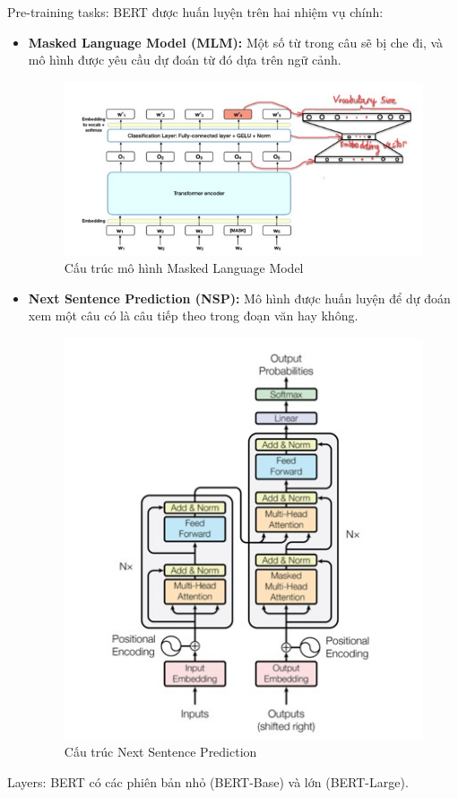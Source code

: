 Pre-training tasks: BERT được huấn luyện trên hai nhiệm vụ chính:
\begin{itemize}
    \item \textbf{Masked Language Model (MLM):} Một số từ trong câu sẽ bị che đi, và mô hình được yêu cầu dự đoán từ đó dựa trên ngữ cảnh.
    \begin{figure}[H] %
        \centering
        \includegraphics[width=0.6\linewidth]{Figures/bert2.jpg}
        \caption{Cấu trúc mô hình Masked Language Model}
        \label{fig:iot}
    \end{figure}

    \item \textbf{Next Sentence Prediction (NSP): } Mô hình được huấn luyện để dự đoán xem một câu có là câu tiếp theo trong đoạn văn hay không.
    \begin{figure}[H] %
        \centering
        \includegraphics[width=0.6\linewidth]{Figures/bert3.jpg}
        \caption{Cấu trúc Next Sentence Prediction}
        \label{fig:iot}
    \end{figure}
    
\end{itemize}

Layers: BERT có các phiên bản nhỏ (BERT-Base) và lớn (BERT-Large). 

